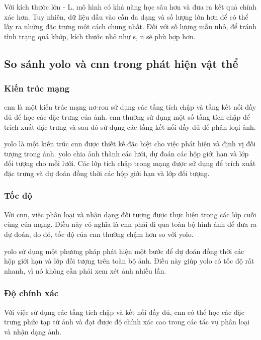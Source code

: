 Với kích thước lớn - L, mô hình có khả năng học sâu hơn và đưa ra kết quả chính xác hơn. Tuy nhiên, dữ liệu đầu vào cần đa dạng và số lượng lớn hơn để có thể lấy ra những đặc trưng một cách chung nhất. Đối với số lượng mẫu nhỏ, để tránh tình trạng quá khớp, kích thước nhỏ như s, n sẽ phù hợp hơn.

\subsection{So sánh \acrshort{yolo} và \acrshort{cnn} trong phát hiện vật thể}


\subsubsection{Kiến trúc mạng}
\acrshort{cnn} là một kiến trúc mạng nơ-ron sử dụng các tầng tích chập và tầng kết nối đầy đủ để học các đặc trưng của ảnh. \acrshort{cnn} thường sử dụng một số tầng tích chập để trích xuất đặc trưng và sau đó sử dụng các tầng kết nối đầy đủ để phân loại ảnh.

\acrshort{yolo} là một kiến trúc \acrshort{cnn} được thiết kế đặc biệt cho việc phát hiện và định vị đối tượng trong ảnh. \acrshort{yolo} chia ảnh thành các lưới, dự đoán các hộp giới hạn và lớp đối tượng cho mỗi lưới. Các lớp tích chập trong mạng được sử dụng để trích xuất đặc trưng và dự đoán đồng thời các hộp giới hạn và lớp đối tượng.

\subsubsection{Tốc độ}

Với \acrshort{cnn}, việc phân loại và nhận dạng đối tượng được thực hiện trong các lớp cuối cùng của mạng. Điều này có nghĩa là \acrshort{cnn} phải đi qua toàn bộ hình ảnh để đưa ra dự đoán, do đó, tốc độ của \acrshort{cnn} thường chậm hơn so với \acrshort{yolo}.

\acrshort{yolo} sử dụng một phương pháp phát hiện một bước để dự đoán đồng thời các hộp giới hạn và lớp đối tượng trên toàn bộ ảnh. Điều này giúp \acrshort{yolo} có tốc độ rất nhanh, vì nó không cần phải xem xét ảnh nhiều lần.


\subsubsection{Độ chính xác}

Với việc sử dụng các tầng tích chập và kết nối đầy đủ, \acrshort{cnn} có thể học các đặc trưng phức tạp từ ảnh và đạt được độ chính xác cao trong các tác vụ phân loại và nhận dạng ảnh.

